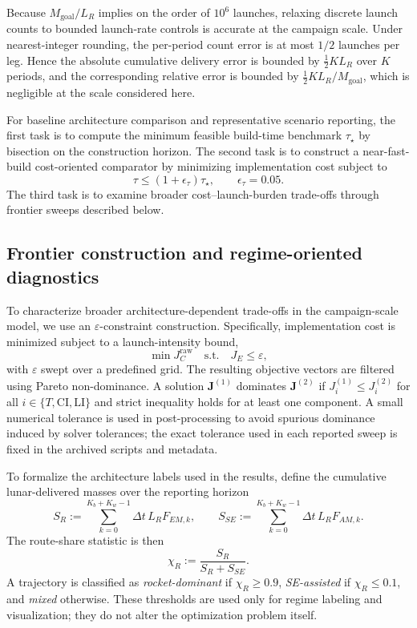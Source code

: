 \documentclass[12pt]{article}
\begin{document}
Because $M_{\mathrm{goal}}/L_R$ implies on the order of $10^6$ launches, relaxing discrete launch counts to bounded launch-rate controls is accurate at the campaign scale. Under nearest-integer rounding, the per-period count error is at most $1/2$ launches per leg. Hence the absolute cumulative delivery error is bounded by $\tfrac12 K L_R$ over $K$ periods, and the corresponding relative error is bounded by $\tfrac12 K L_R/M_{\mathrm{goal}}$, which is negligible at the scale considered here.

For baseline architecture comparison and representative scenario reporting, the first task is to compute the minimum feasible build-time benchmark $\tau_\star$ by bisection on the construction horizon. The second task is to construct a near-fast-build cost-oriented comparator by minimizing implementation cost subject to
\[
\tau \le (1+\epsilon_\tau)\tau_\star,\qquad \epsilon_\tau=0.05.
\]
The third task is to examine broader cost--launch-burden trade-offs through frontier sweeps described below.

\subsection{Frontier construction and regime-oriented diagnostics}
\label{sec:methods_frontier}

To characterize broader architecture-dependent trade-offs in the campaign-scale model, we use an $\varepsilon$-constraint construction. Specifically, implementation cost is minimized subject to a launch-intensity bound,
\[
\min J_C^{\mathrm{raw}}
\quad
\text{s.t.}
\quad
J_E \le \varepsilon ,
\]
with $\varepsilon$ swept over a predefined grid. The resulting objective vectors are filtered using Pareto non-dominance. A solution $\mathbf{J}^{(1)}$ dominates $\mathbf{J}^{(2)}$ if $J_i^{(1)}\le J_i^{(2)}$ for all $i\in\{T,\mathrm{CI},\mathrm{LI}\}$ and strict inequality holds for at least one component. A small numerical tolerance is used in post-processing to avoid spurious dominance induced by solver tolerances; the exact tolerance used in each reported sweep is fixed in the archived scripts and metadata.

To formalize the architecture labels used in the results, define the cumulative lunar-delivered masses over the reporting horizon
\[
S_R:=\sum_{k=0}^{K_b+K_w-1}\Delta t\,L_R F_{EM,k},
\qquad
S_{SE}:=\sum_{k=0}^{K_b+K_w-1}\Delta t\,L_R F_{AM,k}.
\]
The route-share statistic is then
\[
\chi_R:=\frac{S_R}{S_R+S_{SE}}.
\]
A trajectory is classified as \emph{rocket-dominant} if $\chi_R\ge 0.9$, \emph{SE-assisted} if $\chi_R\le 0.1$, and \emph{mixed} otherwise. These thresholds are used only for regime labeling and visualization; they do not alter the optimization problem itself.
\end{document}
